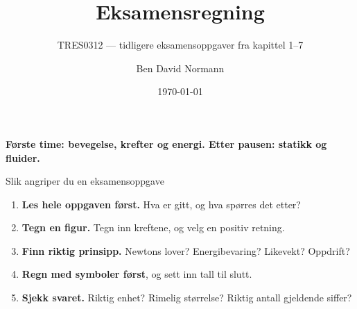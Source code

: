 \documentclass[aspectratio=169, 12pt]{beamer}
\title{Eksamensregning}
\subtitle{TRES0312 --- tidligere eksamensoppgaver fra kapittel 1--7}
\author{Ben David Normann}
\date{\today}
\begin{document}
\begin{frame}[plain]
  \titlepage
  \vspace{0.3cm}
  \begin{center}
  {\bfseries\color{repcol} Første time: bevegelse, krefter og energi. Etter pausen: statikk og fluider.}
  \end{center}
\end{frame}

\begin{frame}{}


\end{frame}

\begin{frame}{Slik angriper du en eksamensoppgave}

  \begin{enumerate}[1.]
    \item<1-> \textbf{Les hele oppgaven først.} Hva er gitt, og hva spørres det etter?
    \item<2-> \textbf{Tegn en figur.} Tegn inn kreftene, og velg en positiv retning.
    \item<3-> \textbf{Finn riktig prinsipp.} Newtons lover? Energibevaring? Likevekt? Oppdrift?
    \item<4-> \textbf{Regn med symboler først}, og sett inn tall til slutt.
    \item<5-> \textbf{Sjekk svaret.} Riktig enhet? Rimelig størrelse? Riktig antall gjeldende siffer?
  \end{enumerate}

\end{frame}
\end{document}
